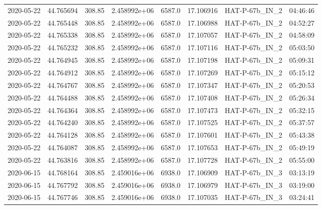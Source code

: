 \documentclass[modern]{aastex631}
\begin{document}
\begin{tabular}{lrrrlrll}
    2020-05-22 & 44.765694   & 308.85        & 2.458992e+06 & 6587.0 & 17.106916 & HAT-P-67b\_IN\_2           & 04:46:46 \\
    2020-05-22 & 44.765448   & 308.85        & 2.458992e+06 & 6587.0 & 17.106988 & HAT-P-67b\_IN\_2           & 04:52:27 \\
    2020-05-22 & 44.765338   & 308.85        & 2.458992e+06 & 6587.0 & 17.107057 & HAT-P-67b\_IN\_2           & 04:58:09 \\
    2020-05-22 & 44.765232   & 308.85        & 2.458992e+06 & 6587.0 & 17.107116 & HAT-P-67b\_IN\_2           & 05:03:50 \\
    2020-05-22 & 44.764945   & 308.85        & 2.458992e+06 & 6587.0 & 17.107198 & HAT-P-67b\_IN\_2           & 05:09:31 \\
    2020-05-22 & 44.764912   & 308.85        & 2.458992e+06 & 6587.0 & 17.107269 & HAT-P-67b\_IN\_2           & 05:15:12 \\
    2020-05-22 & 44.764767   & 308.85        & 2.458992e+06 & 6587.0 & 17.107347 & HAT-P-67b\_IN\_2           & 05:20:53 \\
    2020-05-22 & 44.764488   & 308.85        & 2.458992e+06 & 6587.0 & 17.107408 & HAT-P-67b\_IN\_2           & 05:26:34 \\
    2020-05-22 & 44.764364   & 308.85        & 2.458992e+06 & 6587.0 & 17.107473 & HAT-P-67b\_IN\_2           & 05:32:15 \\
    2020-05-22 & 44.764240   & 308.85        & 2.458992e+06 & 6587.0 & 17.107525 & HAT-P-67b\_IN\_2           & 05:37:57 \\
    2020-05-22 & 44.764128   & 308.85        & 2.458992e+06 & 6587.0 & 17.107601 & HAT-P-67b\_IN\_2           & 05:43:38 \\
    2020-05-22 & 44.764087   & 308.85        & 2.458992e+06 & 6587.0 & 17.107653 & HAT-P-67b\_IN\_2           & 05:49:19 \\
    2020-05-22 & 44.763816   & 308.85        & 2.458992e+06 & 6587.0 & 17.107728 & HAT-P-67b\_IN\_2           & 05:55:00 \\
    2020-06-15 & 44.768164   & 308.85        & 2.459016e+06 & 6938.0 & 17.106909 & HAT-P-67b\_IN\_3           & 03:13:19 \\
    2020-06-15 & 44.767792   & 308.85        & 2.459016e+06 & 6938.0 & 17.106979 & HAT-P-67b\_IN\_3           & 03:19:00 \\
    2020-06-15 & 44.767746   & 308.85        & 2.459016e+06 & 6938.0 & 17.107035 & HAT-P-67b\_IN\_3           & 03:24:41 \\

\end{tabular}
\end{document}

